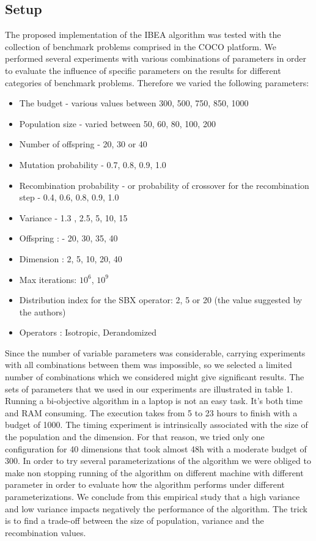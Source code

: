 \documentclass{sig-alternate}
\begin{document}
\subsection{Setup}
The proposed implementation of the IBEA algorithm was tested with the collection of benchmark problems comprised in the COCO platform. We performed several experiments with various combinations of parameters in order to evaluate the influence of specific parameters on the results for different categories of benchmark problems. Therefore we varied the following parameters:
\begin{itemize}
\item The budget - various values between 300, 500, 750, 850, 1000
\item Population size - varied between 50, 60, 80, 100, 200
\item Number of offspring - 20, 30 or 40
\item Mutation probability - 0.7, 0.8, 0.9, 1.0
\item Recombination probability - or probability of crossover for the recombination step - 0.4, 0.6, 0.8, 0.9, 1.0
\item Variance - 1.3 , 2.5, 5, 10, 15
\item Offspring : - 20, 30, 35, 40
\item Dimension : 2, 5, 10, 20, 40
\item Max iterations: $10^6$, $10^9$
\item Distribution index for the SBX operator: 2, 5 or 20 (the value suggested by the authors)
\item Operators : Isotropic, Derandomized
\end{itemize}

Since the number of variable parameters was considerable, carrying experiments with all combinations between them was impossible, so we selected a limited number of combinations which we considered might give significant results. The sets of parameters that we used in our experiments are illustrated in table 1.  
Running a bi-objective algorithm in a laptop is not an easy task. It's both time and RAM consuming.  The execution takes from 5 to 23 hours to finish with a budget of 1000. The timing experiment  is intrinsically associated with the size of the population and the dimension. 
For that reason, we tried only one configuration for 40 dimensions that took almost 48h  with a moderate budget of 300.  
In order to try several parameterizations of the algorithm we  were obliged to make non stopping running of the algorithm on different machine with different parameter in order to evaluate how  the algorithm performs under different parameterizations. We conclude from this empirical study that a high variance and low variance impacts negatively the performance of the algorithm. The trick is to find a trade-off between the size of population, variance and the recombination values.
\end{document}
